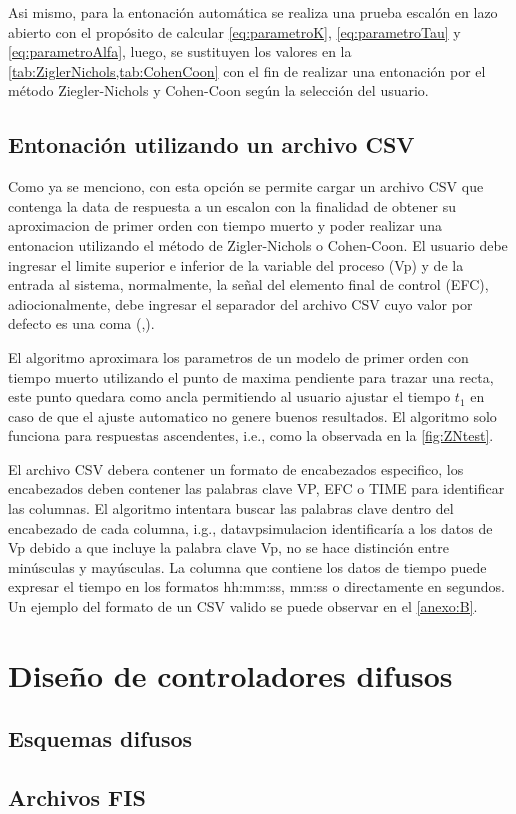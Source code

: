         Asi mismo, para la entonación automática se realiza una prueba escalón en lazo abierto con el propósito de calcular \cref{eq:parametroK}, \cref{eq:parametroTau} y \cref{eq:parametroAlfa}, luego, se sustituyen los valores en la \cref{tab:ZiglerNichols,tab:CohenCoon} con el fin de realizar una entonación por el método Ziegler-Nichols y Cohen-Coon según la selección del usuario.

    \subsection{Entonación utilizando un archivo CSV}

        Como ya se menciono, con esta opción se permite cargar un archivo CSV que contenga la data de respuesta a un escalon con la finalidad de obtener su aproximacion de primer orden con tiempo muerto y poder realizar una entonacion utilizando el método de Zigler-Nichols o Cohen-Coon. El usuario debe ingresar el limite superior e inferior de la variable del proceso (Vp) y de la entrada al sistema, normalmente, la señal del elemento final de control (EFC), adiocionalmente, debe ingresar el separador del archivo CSV cuyo valor por defecto es una coma (,).

        El algoritmo aproximara los parametros de un modelo de primer orden con tiempo muerto utilizando el punto de maxima pendiente para trazar una recta, este punto quedara como ancla permitiendo al usuario ajustar el tiempo $t_1$ en caso de que el ajuste automatico no genere buenos resultados. El algoritmo solo funciona para respuestas ascendentes, i.e., como la observada en la \cref{fig:ZNtest}.

        El archivo CSV debera contener un formato de encabezados especifico, los encabezados deben contener las palabras clave VP, EFC o TIME para identificar las columnas. El algoritmo intentara buscar las palabras clave dentro del encabezado de cada columna, i.g., datavpsimulacion identificaría a los datos de Vp debido a que incluye la palabra clave Vp, no se hace distinción entre minúsculas y mayúsculas. La columna que contiene los datos de tiempo puede expresar el tiempo en los formatos hh:mm:ss, mm:ss o directamente en segundos. Un ejemplo del formato de un CSV valido se puede observar en el \ref{anexo:B}.

\section{Diseño de controladores difusos}

    \subsection{Esquemas difusos}
    \subsection{Archivos FIS}
